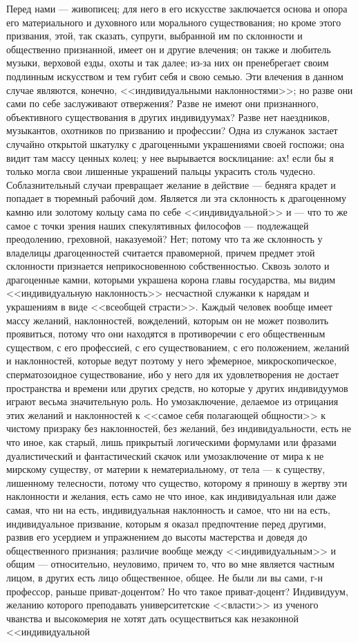 \documentclass[12pt]{article}
\begin{document}
Перед нами --- живописец; для него в его искусстве заключается основа и опора его материального и духовного или морального существования; но кроме этого призвания, этой, так сказать, супруги, выбранной им по склонности и общественно признанной, имеет он и другие влечения; он также и любитель музыки, верховой езды, охоты и так далее; из-за них он пренебрегает своим подлинным искусством и тем губит себя и свою семью. Эти влечения в данном случае являются, конечно, <<индивидуальными наклонностями>>; но разве они сами по себе заслуживают отвержения? Разве не имеют они признанного, объективного существования в других индивидуумах? Разве нет наездников, музыкантов, охотников по призванию и профессии? Одна из служанок застает случайно открытой шкатулку с драгоценными украшениями своей госпожи; она видит там массу ценных колец; у нее вырывается восклицание: ах! если бы я только могла свои лишенные украшений пальцы украсить столь чудесно. Соблазнительный случаи превращает желание в действие --- бедняга крадет и попадает в тюремный рабочий дом. Является ли эта склонность к драгоценному камню или золотому кольцу сама по себе <<индивидуальной>> и --- что то же самое с точки зрения наших спекулятивных философов --- подлежащей преодолению, греховной, наказуемой? Нет; потому что та же склонность у владелицы драгоценностей считается правомерной, причем предмет этой склонности признается неприкосновенною собственностью. Сквозь золото и драгоценные камни, которыми украшена корона главы государства, мы видим <<индивидуальную наклонность>> несчастной служанки к нарядам и украшениям в виде <<всеобщей страсти>>. Каждый человек вообще имеет массу желаний, наклонностей, вожделений, которым он не может позволить проявиться, потому что они находятся в противоречии с его общественным существом, с его профессией, с его существованием, с его положением, желаний и наклонностей, которые ведут поэтому у него эфемерное, микроскопическое, сперматозоидное существование, ибо у него для их удовлетворения не достает пространства и времени или других средств, но которые у других индивидуумов играют весьма значительную роль. Но умозаключение, делаемое из отрицания этих желаний и наклонностей к <<самое себя полагающей общности>>  к чистому призраку без наклонностей, без желаний, без индивидуальности, есть не что иное, как старый, лишь прикрытый логическими формулами или фразами дуалистический и фантастический скачок или умозаключение от мира к не мирскому существу, от материи к нематериальному, от тела --- к существу, лишенному телесности, потому что существо, которому я приношу в жертву эти наклонности и желания, есть само не что иное, как индивидуальная или даже самая, что ни на есть, индивидуальная наклонность и самое, что ни на есть, индивидуальное призвание, которым я оказал предпочтение перед другими, развив его усердием и упражнением до высоты мастерства и доведя до общественного признания; различие вообще между <<индивидуальным>> и общим --- относительно, неуловимо, причем то, что во мне является частным лицом, в других есть лицо общественное, общее. Не были ли вы сами, г-н профессор, раньше приват-доцентом? Но что такое приват-доцент? Индивидуум, желанию которого преподавать университетские <<власти>> из ученого чванства и высокомерия не хотят дать осуществиться как незаконной <<индивидуальной 
\end{document}
